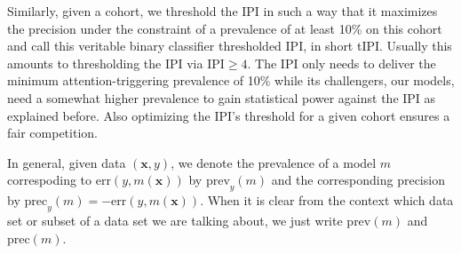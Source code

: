Similarly, given a cohort, we threshold the IPI in such a way that it maximizes the precision under 
the constraint of a prevalence of at least \num{10}\% on this cohort and call this veritable 
binary classifier thresholded IPI, in short tIPI. Usually this amounts to thresholding the IPI via 
$\text{IPI} \geq 4$. The IPI only needs to deliver the minimum 
attention-triggering prevalence of \num{10}\% while its challengers, our models, need a somewhat 
higher prevalence to gain statistical power against the IPI as explained before. Also optimizing 
the IPI's threshold for a given cohort ensures a fair competition.

In general, given data $(\mathbf{x}, y)$, we denote the prevalence of a model $m$ correspoding to 
$\text{err}(y, m(\textbf{x}))$ by $\text{prev}_y(m)$ and the corresponding precision by $\text{prec}_y(m) = 
-\text{err}(y, m(\textbf{x}))$. When it is clear from the context which data set or subset of a data set 
we are talking about, we just write $\text{prev}(m)$ and $\text{prec}(m)$.

